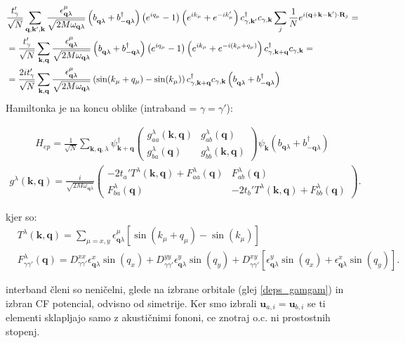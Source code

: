 \documentclass[a4paper,10pt]{article}
\renewcommand{\vec}[1]{\mathbf{#1}}
\begin{document}
\begin{align}
  &\frac{t_\gamma'}{\sqrt N} \sum_{\vec q,\vec k',\vec k}  \frac{\epsilon_{\vec q\lambda}^{\mu}}{\sqrt{2M\omega_{\vec{q}\lambda}}} \left( b^{\vphantom{\dagger}}_{\vec{q}\lambda} + b_{-\vec{q}\lambda}^\dagger \right) \left(e^{iq_\mu}-1\right) \left(e^{ik_\mu}+e^{-ik_\mu'}\right) c_{\gamma,\vec k'}^\dagger c_{\gamma,\vec k} \sum_j \frac{1}{N} e^{i(\vec q+\vec k-\vec k')\cdot\vec R_j}  = \\
  &= \frac{t_\gamma'}{\sqrt N} \sum_{\vec k,\vec q} \frac{\epsilon_{\vec q\lambda}^{\mu}}{\sqrt{2M\omega_{\vec{q}\lambda}}} \left( b^{\vphantom{\dagger}}_{\vec{q}\lambda} + b_{-\vec{q}\lambda}^\dagger \right) \left(e^{iq_\mu}-1\right) \left(e^{ik_\mu}+e^{-i(k_\mu+q_\mu)}\right) c_{\gamma,\vec k+\vec q}^\dagger c_{\gamma,\vec k} = \\
  &= \frac{2 i t_\gamma'}{\sqrt N} \sum_{\vec k,\vec q} \frac{\epsilon_{\vec q\lambda}^{\mu}}{\sqrt{2M\omega_{\vec{q}\lambda}}}  \left(\sin(k_\mu + q_\mu)  - \sin(k_\mu)\right) c_{\gamma,\vec k+\vec q}^\dagger c_{\gamma,\vec k} \left( b^{\vphantom{\dagger}}_{\vec{q}\lambda} + b_{-\vec{q}\lambda}^\dagger \right)
\end{align}
Hamiltonka je na koncu oblike (intraband = $\gamma = \gamma'$):
\begin{tcolorbox}
\begin{align}
  H_{ep} = \frac1{\sqrt N} \sum_{\vec k,\vec q,\lambda} \psi_{\vec k+\vec q}^{\dagger} \begin{pmatrix} g_{aa}^{\lambda}(\vec k,\vec q) & g_{ab}^{\lambda}(\vec q)\\ g_{ba}^{\lambda}(\vec q) & g_{bb}^{\lambda}(\vec k,\vec q) \end{pmatrix} \psi_{\vec k} \left( b_{\vec q\lambda}+b_{-\vec q\lambda}^{\dagger} \right)
\end{align}
\begin{align}
   g^\lambda(\vec k,\vec q) = \frac{i}{\sqrt{2M\omega_{\vec q\lambda}}} \begin{pmatrix} -2t_a'T^\lambda(\vec k,\vec q) +{F_{aa}^\lambda(\vec q)} & {F_{ab}^\lambda(\vec q)}\\ {F_{ba}^\lambda(\vec q)} & -2t_b'T^\lambda(\vec k,\vec q) +{F_{bb}^\lambda(\vec q)} \end{pmatrix}.
\end{align}

kjer so: 
\begin{align}
  &T^\lambda(\vec k,\vec q) =\sum_{\mu=x,y}\epsilon_{\vec q\lambda}^{\mu} \left[\sin(k_\mu+q_\mu)-\sin(k_\mu)\right] \\
  &F_{\gamma\gamma'}^\lambda(\vec q) = D_{\gamma\gamma'}^{xx}\epsilon_{\vec q\lambda}^{x}\sin(q_x) + D_{\gamma\gamma'}^{yy}\epsilon_{\vec q\lambda}^{y}\sin(q_y) + D_{\gamma\gamma'}^{xy} \left[ \epsilon_{\vec q\lambda}^{y}\sin(q_x) + \epsilon_{\vec q\lambda}^{x}\sin(q_y)
\right].
\end{align}
\end{tcolorbox}
interband členi so neničelni, glede na izbrane orbitale (glej \eqref{deps_gamgam}) in izbran CF potencial, odvisno od simetrije. Ker smo izbrali $\vec u_{a,i} = \vec u_{b,i}$ se ti elementi sklapljajo samo z akustičnimi fononi, ce znotraj o.c. ni prostostnih stopenj. 
\end{document}
